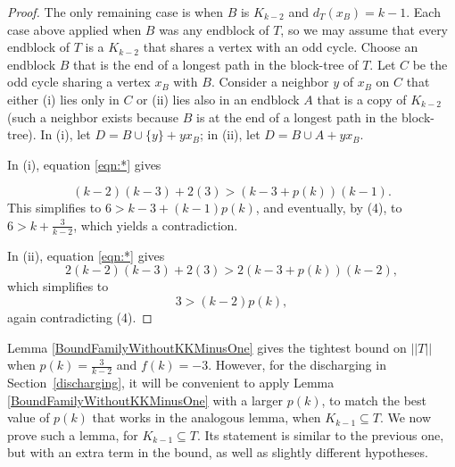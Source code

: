 \documentclass[12pt]{article}
\theoremstyle{plain}
\theoremstyle{definition}
\theoremstyle{remark}
\newcommand{\card}[1]{\left|#1\right|}
\newcommand{\size}[1]{\left\Vert#1\right\Vert}
\begin{document}
\begin{proof}
The only remaining case is when $B$ is $K_{k-2}$ and $d_T(x_B) =
k - 1$.  Each case above applied when $B$ was any endblock of $T$, so we may
assume that every endblock of $T$ is a $K_{k-2}$ that shares a vertex with an
odd cycle.  Choose an endblock $B$ that is the end of a longest path in the
block-tree of $T$.  Let $C$ be the odd cycle sharing a vertex $x_B$ with $B$. 
Consider a neighbor $y$ of $x_B$ on $C$ that either (i) lies only in $C$
or (ii) lies also in an endblock $A$ that is a copy of $K_{k-2}$ (such a
neighbor exists because $B$ is at the end of a longest path in the block-tree).
In (i), let $D=B\cup\{y\}+yx_B$; in (ii), let $D=B\cup A+yx_B$.

In (i), equation \eqref{eqn:*} gives

\[(k-2)(k-3)+2(3) > (k-3+p(k))(k-1).\]
%
This simplifies to $6>k-3+(k-1)p(k)$, and eventually, by (4), to $6>k+\frac3{k-2}$, which yields a contradiction.

In (ii), equation \eqref{eqn:*} gives
	\[2(k-2)(k-3) + 2(3) > 2(k-3 + p(k))(k-2),\]
	which simplifies to
	\[3 > (k-2)p(k),\]
	again contradicting (4).
\end{proof}

Lemma \ref{BoundFamilyWithoutKKMinusOne} gives the tightest bound on $||T||$ when $p(k) = \frac{3}{k-2}$ and $f(k) = -3$.   However, for the discharging in Section~\ref{discharging}, it will be convenient to apply Lemma \ref{BoundFamilyWithoutKKMinusOne} with a larger $p(k)$, to match the best value of $p(k)$ that works in the analogous lemma, when $K_{k-1}\subseteq T$.  We now prove such a lemma, for $K_{k-1}\subseteq T$.  Its statement is similar to the previous one, but with an extra term in the bound, as well as slightly different hypotheses.
\end{document}
